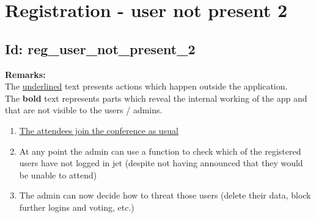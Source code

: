 \documentclass{article}
\begin{document}
\section*{Registration - user not present 2}
\subsection*{Id: reg\_user\_not\_present\_2}
\noindent
\textbf{Remarks:}\\
 The \underline{underlined} text presents actions which happen outside the application. \\
 The \textbf{bold} text represents parts which reveal the internal working of the app and that are not visible to the users / admins.
\begin{enumerate}
	\item \underline{The attendees join the conference as usual}
	\item At any point the admin can use a function to check which of the registered users have not logged in jet (despite not having announced that they would be unable to attend)
	\item The admin can now decide how to threat those users (delete their data, block further logins and voting, etc.)
\end{enumerate}
\end{document}
